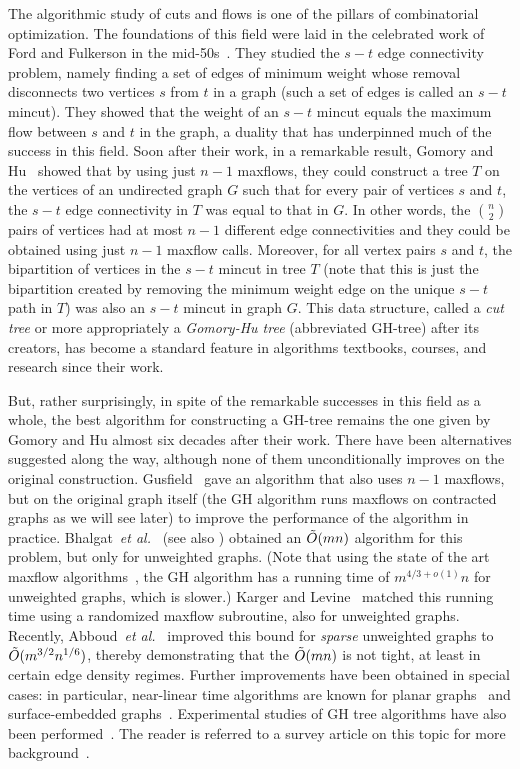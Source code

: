 The algorithmic study of cuts and flows is one of the pillars of combinatorial optimization. The foundations of this field were laid 
in the celebrated work of Ford and Fulkerson in the mid-50s~\cite{FordF56}. They studied the $s-t$ edge connectivity problem, namely finding a set of edges of minimum weight whose removal disconnects two vertices $s$ from $t$ in a graph (such a set of edges is called an $s-t$ mincut). They showed that the weight of an $s-t$ mincut equals the maximum flow between $s$ and $t$ in the graph, a duality that has underpinned much of the success in this field. Soon after their work, in a remarkable result, Gomory and Hu~\cite{GomoryH61} showed that by using just $n-1$ maxflows, they could construct a tree $T$ on the vertices of an undirected graph $G$ such that for every pair of vertices $s$ and $t$, the $s-t$ edge connectivity in $T$ was equal to that in $G$. In other words, the $n\choose 2$ pairs of vertices had at most $n-1$ different edge connectivities and they could be obtained using just $n-1$ maxflow calls. Moreover, for all vertex pairs $s$ and $t$, the bipartition of vertices in the $s-t$ mincut in tree $T$ (note that this is just the bipartition created by removing the minimum weight edge on the unique $s-t$ path in $T$) was also an $s-t$ mincut in graph $G$. This data structure, called a {\em cut tree} or more appropriately a {\em Gomory-Hu tree} (abbreviated GH-tree) after its creators, has become a standard feature in algorithms textbooks, courses, and research since their work.

But, rather surprisingly, in spite of the remarkable successes in this field as a whole, the best algorithm for constructing a GH-tree remains the one given by Gomory and Hu almost six decades after their work. There have been alternatives suggested along the way, although none of them unconditionally improves on the original construction. Gusfield~\cite{Gusfield} gave an algorithm that also uses $n-1$ maxflows, but on the original graph itself (the GH algorithm runs maxflows on contracted graphs as we will see later) to improve the performance of the algorithm in practice. Bhalgat~{\em et al.}~\cite{BhalgatHKP08} (see also \cite{HariharanKP07}) obtained an $\tilde{O}(mn)$ algorithm for this problem, but only for unweighted graphs. (Note that using the state of the art maxflow algorithms~\cite{liu2020faster}, the GH algorithm has a running time of $m^{4/3+o(1)}n$ for unweighted graphs, which is slower.) Karger and Levine~\cite{KargerL} matched this running time using a randomized maxflow subroutine, also for unweighted graphs. Recently, Abboud~{\em et al.}~\cite{AbboudKT20a} improved this bound for {\em sparse} unweighted graphs to $\tilde{O}(m^{3/2}n^{1/6})$, thereby demonstrating that the $\tilde{O}(mn)$ is not tight, at least in certain edge density regimes. Further improvements have been obtained in special cases: in particular, near-linear time algorithms are known for planar graphs~\cite{BorradaileSW15} and surface-embedded graphs~\cite{BorradaileENW16}. Experimental studies of GH tree algorithms have also been performed~\cite{GoldbergT01}. The reader is referred to a survey article on this topic for more background~\cite{P16}.

